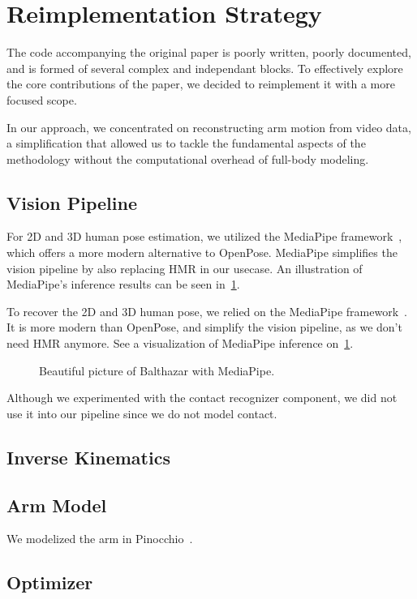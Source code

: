 \section{Reimplementation Strategy}
\label{sec:remplementation}

The code accompanying the original paper  is poorly written, poorly documented, and is formed of several complex and independant blocks. 
To effectively explore the core contributions of the paper, we decided to reimplement it with a more focused scope.

In our approach, we concentrated on reconstructing arm motion from video data, a simplification that allowed us to tackle the fundamental 
aspects of the methodology without the computational overhead of full-body modeling.

\subsection{Vision Pipeline}
\label{subsec:vision_pipeline}

For 2D and 3D human pose estimation, we utilized the MediaPipe framework~\cite{lugaresi2019mediapipe}, which offers a more modern alternative 
to OpenPose. MediaPipe simplifies the vision pipeline by also replacing HMR in our usecase. An illustration of MediaPipe's inference results 
can be seen in~\cref{fig:mediapipe}.

To recover the 2D and 3D human pose, we relied on the MediaPipe framework~\cite{lugaresi2019mediapipe}. It is more modern than OpenPose, and 
simplify the vision pipeline, as we don't need HMR anymore. See a visualization of MediaPipe inference on~\cref{fig:mediapipe}.

\begin{figure}
    \centering
    \fbox{\rule{0pt}{2in} \rule{0.9\linewidth}{0pt}}
    \caption{Beautiful picture of Balthazar with MediaPipe.}
    \label{fig:mediapipe}
\end{figure}

Although we experimented with the contact recognizer component, we did not use it into our pipeline since we do not model contact.

\subsection{Inverse Kinematics}

\subsection{Arm Model}

We modelized the arm in Pinocchio~\cite{carpentier2019pinocchio}.

\subsection{Optimizer}

